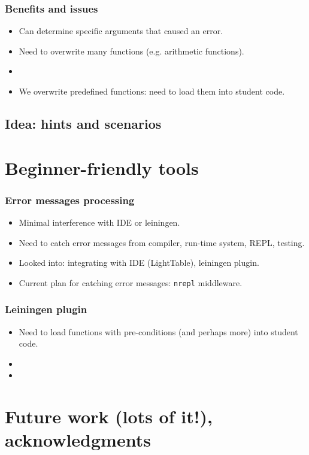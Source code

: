 \documentclass{beamer}
\begin{document}
\begin{frame}
 \frametitle {Benefits and issues}
\begin{itemize}
\item Can determine specific arguments that caused an error. 
\item Need to overwrite many functions (e.g. arithmetic functions).
\item 
\item We overwrite predefined functions: need to load them into student code. 
\end{itemize}
\end{frame}

\subsection{Idea: hints and scenarios}

\section{Beginner-friendly tools}

\begin{frame}
   \frametitle{Error messages processing}
\begin{itemize}
\item Minimal interference with IDE or leiningen.
\item Need to catch error messages from compiler,  run-time system, REPL, testing.
\item Looked into: integrating with IDE (LightTable), leiningen plugin. 
\item Current plan for catching error messages: {\tt nrepl} middleware. 
\end{itemize}
\end{frame}

\begin{frame}
   \frametitle{Leiningen plugin}
\begin{itemize}
\item Need to load functions with pre-conditions (and perhaps more) into student code. 
\item 
\item 
\end{itemize}
\end{frame}

\section{Future work (lots of it!), acknowledgments}
\end{document}

